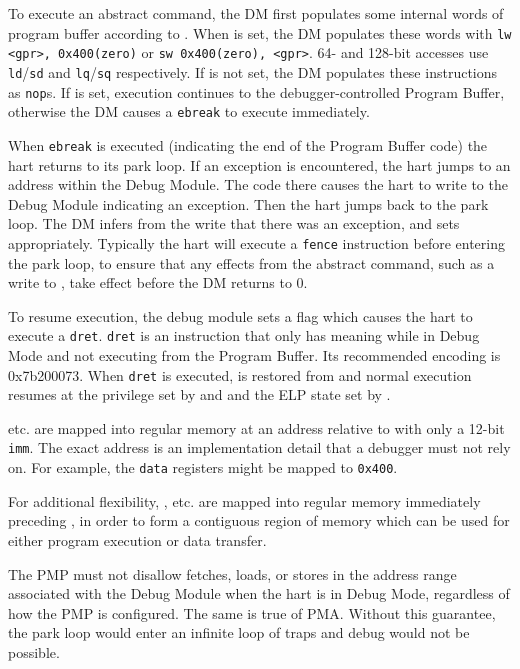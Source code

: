 To execute an abstract command, the DM first populates some internal words of
program buffer according to \RdmCommand. When \FacAccessregisterTransfer is set, the DM
populates these words with {\tt lw <gpr>, 0x400(zero)} or {\tt sw 0x400(zero), <gpr>}.
64- and 128-bit accesses use {\tt ld}/{\tt sd} and {\tt lq}/{\tt sq}
respectively. If \FacAccessregisterTransfer is not set, the DM populates these instructions as {\tt nop}s.
If \FacAccessregisterPostexec is set, execution continues to the debugger-controlled Program Buffer,
otherwise the DM causes a {\tt ebreak} to execute immediately.

When {\tt ebreak} is executed (indicating the end of the
Program Buffer code) the hart returns to its park loop. If an exception is
encountered, the hart jumps to an address within
the Debug Module. The code there causes the hart to
write to the Debug Module indicating an exception.
Then the hart jumps back to the park loop.
The DM infers from the write that there was an exception, and sets \FdmAbstractcsCmderr appropriately.
Typically the hart will execute a {\tt fence} instruction before entering the
park loop, to ensure that any effects from the abstract command, such as a
write to \RdmDataZero, take effect before the DM returns \FdmAbstractcsBusy
to 0.

To resume execution, the debug module sets a flag which causes the hart to execute a {\tt dret}.
{\tt dret} is an instruction that only has meaning while in Debug Mode and
not executing from the Program Buffer.
Its recommended encoding is 0x7b200073.
When {\tt dret} is executed, \Rpc is restored from \RcsrDpc and normal execution resumes at the
privilege set by \FcsrDcsrPrv and \FcsrDcsrV and the ELP state set by \FcsrDcsrElp.

\RdmDataZero etc. are mapped into regular memory at an address relative to \Rzero
with only a 12-bit {\tt imm}. The exact address is an implementation
detail that a debugger must not rely on. For example, the {\tt data}
registers might be mapped to {\tt 0x400}.

For additional flexibility, \RdmProgbufZero, etc. are mapped into regular memory
immediately preceding \RdmDataZero, in order to form a contiguous region of memory which
can be used for either program execution or data transfer.

The PMP must not disallow fetches,
loads, or stores in the address range associated with the Debug Module when the
hart is in Debug Mode, regardless of how the PMP is configured.  The same is
true of PMA.  Without this guarantee, the park loop would enter an infinite
loop of traps and debug would not be possible.

